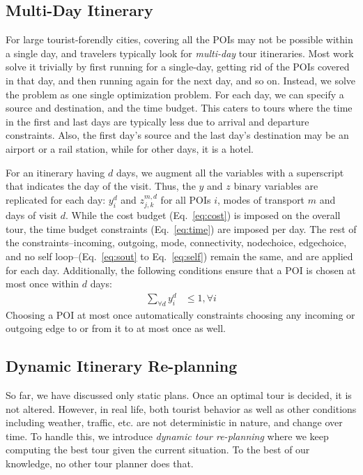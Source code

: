 \subsection{Multi-Day Itinerary}
\label{sec:multiday}

For large tourist-forendly cities, covering all the POIs may not be
possible within a single day, and travelers typically look for
\emph{multi-day} tour itineraries.  Most work solve it trivially by first
running for a single-day, getting rid of the POIs covered in that day, and
then running again for the next day, and so on.  Instead, we solve the
problem as one single optimization problem.  For each day, we can specify a
source and destination, and the time budget.  This caters to tours where
the time in the first and last days are typically less due to arrival and
departure constraints.  Also, the first day's source and the last day's
destination may be an airport or a rail station, while for other days, it
is a hotel.

For an itinerary having $d$ days, we augment all the variables with a
superscript that indicates the day of the visit.  Thus, the $y$ and $z$
binary variables are replicated for each day: $y^d_i$ and $z^{m,d}_{j,k}$
for all POIs $i$, modes of transport $m$ and days of visit $d$.  While the
cost budget (Eq.~\eqref{eq:cost}) is imposed on the overall tour, the time
budget constraints (Eq.~\eqref{eq:time}) are imposed per day.  The rest of
the constraints--incoming, outgoing, mode, connectivity, nodechoice,
edgechoice, and no self loop--(Eq.~\eqref{eq:sout} to Eq.~\eqref{eq:self})
remain the same, and are applied for each day.  Additionally, the following
conditions ensure that a POI is chosen at most once within $d$ days:
%
\begin{align}
	\label{eq:multiday}
	\sum_{\forall d} y^d_i & \leq 1, \forall i
\end{align}
%
Choosing a POI at most once automatically constraints choosing any incoming
or outgoing edge to or from it to at most once as well.

\subsection{Dynamic Itinerary Re-planning}
\label{sec:dynamic}

So far, we have discussed only static plans.
Once an optimal tour is decided, it is not altered.
However, in real life, both tourist behavior as well as other conditions including weather, traffic, etc. are not deterministic in nature, and change over time.
To handle this, we introduce \emph{dynamic tour re-planning} where we keep computing the best tour given the current situation.
To the best of our knowledge, no other tour planner does that.

